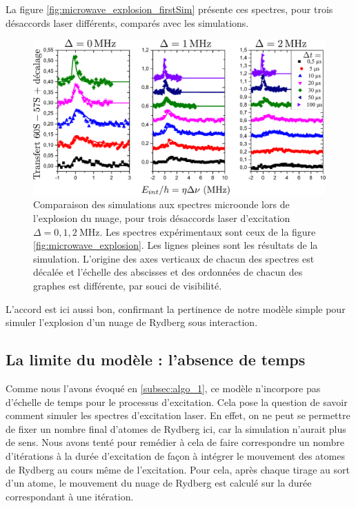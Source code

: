 La figure \eqref{fig:microwave_explosion_firstSim} présente ces spectres, pour trois désaccords laser différents, comparés avec les simulations.
%
\begin{figure}[!h]
\centering
\includegraphics[width=\linewidth]{figures/low_l/expansion_012MHz_fisrtSim}
\caption[Comparaison des simulations aux spectres microonde lors de l'explosion du nuage]{
Comparaison des simulations aux spectres microonde lors de l'explosion du nuage, pour trois désaccords laser d'excitation $\Delta = \num{0}, \num{1}, \SI{2}{\MHz}$.
Les spectres expérimentaux sont ceux de la figure \ref{fig:microwave_explosion}.
Les lignes pleines sont les résultats de la simulation.
L'origine des axes verticaux de chacun des spectres est décalée et l'échelle des abscisses et des ordonnées de chacun des graphes est différente, par souci de visibilité.
}
\label{fig:microwave_explosion_firstSim}
\end{figure}
%
L'accord est ici aussi bon, confirmant la pertinence de notre modèle simple pour simuler l'explosion d'un nuage de Rydberg sous interaction.
\clearpage

\subsection{La limite du modèle : l'absence de temps}
\noindent Comme nous l'avons évoqué en \ref{subsec:algo_1}, ce modèle n'incorpore pas d'échelle de temps pour le processus d'excitation.
Cela pose la question de savoir comment simuler les spectres d'excitation laser.
En effet, on ne peut se permettre de fixer un nombre final d'atomes de Rydberg ici, car la simulation n'aurait plus de sens.
Nous avons tenté pour remédier à cela de faire correspondre un nombre d'itérations à la durée d'excitation 
de façon à intégrer le mouvement des atomes de Rydberg au cours même de l'excitation.%
Pour cela, après chaque tirage au sort d'un atome, le mouvement du nuage de Rydberg est calculé sur la durée correspondant à une itération.

